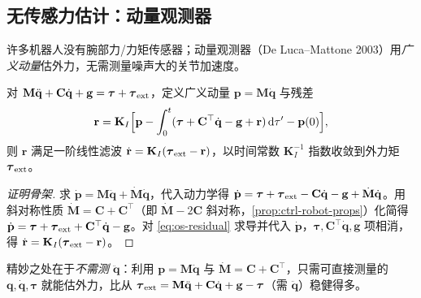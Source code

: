 \subsection{无传感力估计：动量观测器}
\label{sec:os-observer}

许多机器人没有腕部力/力矩传感器；动量观测器（De Luca--Mattone 2003）用\emph{广义动量}估外力，无需测量噪声大的关节加速度。

\begin{theorem}[广义动量观测器]
\label{thm:os-observer}
对 $\mathbf M\ddot{\mathbf q}+\mathbf C\dot{\mathbf q}+\mathbf g=\boldsymbol\tau+\boldsymbol\tau_{\rm ext}$，定义广义动量 $\mathbf p=\mathbf M\dot{\mathbf q}$ 与残差
\begin{equation}
  \mathbf r=\mathbf K_I\Bigl[\mathbf p-\int_0^t(\boldsymbol\tau+\mathbf C^\top\dot{\mathbf q}-\mathbf g+\mathbf r)\,\mathrm d\tau'-\mathbf p(0)\Bigr],
  \label{eq:os-residual}
\end{equation}
则 $\mathbf r$ 满足一阶线性滤波 $\dot{\mathbf r}=\mathbf K_I(\boldsymbol\tau_{\rm ext}-\mathbf r)$，以时间常数 $\mathbf K_I^{-1}$ 指数收敛到外力矩 $\boldsymbol\tau_{\rm ext}$。
\end{theorem}
\begin{proof}[证明骨架]
求 $\dot{\mathbf p}=\mathbf M\ddot{\mathbf q}+\dot{\mathbf M}\dot{\mathbf q}$，代入动力学得 $\dot{\mathbf p}=\boldsymbol\tau+\boldsymbol\tau_{\rm ext}-\mathbf C\dot{\mathbf q}-\mathbf g+\dot{\mathbf M}\dot{\mathbf q}$。用斜对称性质 $\dot{\mathbf M}=\mathbf C+\mathbf C^\top$（即 $\dot{\mathbf M}-2\mathbf C$ 斜对称，\cref{prop:ctrl-robot-props}）化简得 $\dot{\mathbf p}=\boldsymbol\tau+\boldsymbol\tau_{\rm ext}+\mathbf C^\top\dot{\mathbf q}-\mathbf g$。对 \cref{eq:os-residual} 求导并代入 $\dot{\mathbf p}$，$\boldsymbol\tau,\mathbf C^\top\dot{\mathbf q},\mathbf g$ 项相消，得 $\dot{\mathbf r}=\mathbf K_I(\boldsymbol\tau_{\rm ext}-\mathbf r)$。
\end{proof}

\begin{insight}
精妙之处在于\emph{不需测 $\ddot{\mathbf q}$}：利用 $\mathbf p=\mathbf M\dot{\mathbf q}$ 与 $\dot{\mathbf M}=\mathbf C+\mathbf C^\top$，只需可直接测量的 $\mathbf q,\dot{\mathbf q},\boldsymbol\tau$ 就能估外力，比从 $\boldsymbol\tau_{\rm ext}=\mathbf M\ddot{\mathbf q}+\mathbf C\dot{\mathbf q}+\mathbf g-\boldsymbol\tau$（需 $\ddot{\mathbf q}$）稳健得多。
\end{insight}

